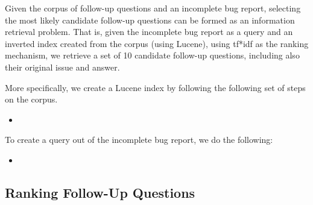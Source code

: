 Given the corpus of follow-up questions and an incomplete bug report, selecting the
most likely candidate follow-up questions can be formed as an information retrieval
problem. That is, given the incomplete bug report as a query and an inverted index
created from the corpus (using Lucene), using tf*idf as the ranking mechanism, we
retrieve a set of 10 candidate follow-up questions, including also their original issue
and answer.

More specifically, we create a Lucene index by following the following set of steps
on the corpus.
\begin{itemize}
\item
\end{itemize}

To create a query out of the incomplete bug report, we do the following:
\begin{itemize}
\item
\end{itemize}


\subsection{Ranking Follow-Up Questions}

%
%
%
